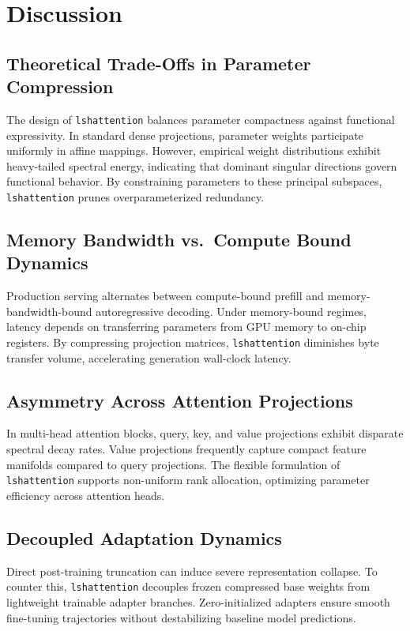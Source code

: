 \section{Discussion}

\subsection{Theoretical Trade-Offs in Parameter Compression}
The design of \texttt{lshattention} balances parameter compactness against functional expressivity. In standard dense projections, parameter weights participate uniformly in affine mappings. However, empirical weight distributions exhibit heavy-tailed spectral energy, indicating that dominant singular directions govern functional behavior. By constraining parameters to these principal subspaces, \texttt{lshattention} prunes overparameterized redundancy.

\subsection{Memory Bandwidth vs.\ Compute Bound Dynamics}
Production serving alternates between compute-bound prefill and memory-bandwidth-bound autoregressive decoding. Under memory-bound regimes, latency depends on transferring parameters from GPU memory to on-chip registers. By compressing projection matrices, \texttt{lshattention} diminishes byte transfer volume, accelerating generation wall-clock latency.

\subsection{Asymmetry Across Attention Projections}
In multi-head attention blocks, query, key, and value projections exhibit disparate spectral decay rates. Value projections frequently capture compact feature manifolds compared to query projections. The flexible formulation of \texttt{lshattention} supports non-uniform rank allocation, optimizing parameter efficiency across attention heads.

\subsection{Decoupled Adaptation Dynamics}
Direct post-training truncation can induce severe representation collapse. To counter this, \texttt{lshattention} decouples frozen compressed base weights from lightweight trainable adapter branches. Zero-initialized adapters ensure smooth fine-tuning trajectories without destabilizing baseline model predictions.


